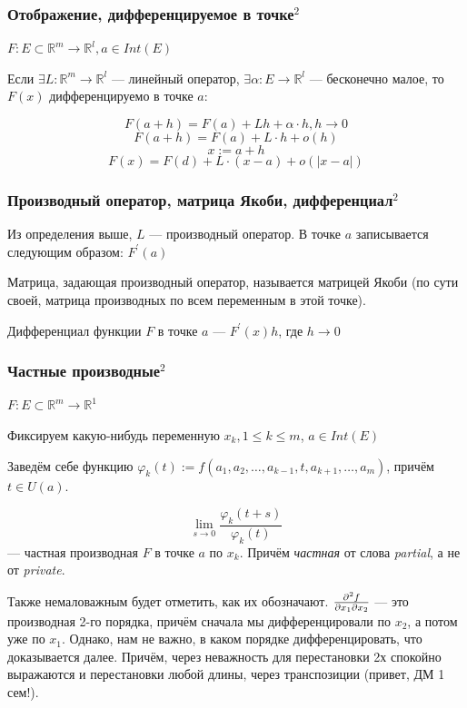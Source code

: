 \documentclass{article}
\begin{document}
\subsubsection{Отображение, дифференцируемое в точке\texorpdfstring{$^2$}{}}

$F : E \subset \mathbb{R}^m \rightarrow \mathbb{R}^l, a \in Int(E)$

Если $\exists L : \mathbb{R}^m \rightarrow \mathbb{R}^l$ --- линейный оператор, $\exists \alpha : E \rightarrow \mathbb{R}^l$ --- бесконечно малое, то $F(x)$ дифференцируемо в точке $a$:

$$
F(a+h)=F(a)+Lh+\alpha \cdot h, h \rightarrow 0
$$
$$
F(a+h)=F(a)+L \cdot h+o(h)
$$
$$
x:=a+h
$$
$$
F(x)=F(d)+L \cdot(x-a)+o(|x-a|)
$$

\subsubsection{Производный оператор, матрица Якоби, дифференциал\texorpdfstring{$^2$}{}}

Из определения выше, $L$ --- производный оператор.
В точке $a$ записывается следующим образом: $F^\prime(a)$


Матрица, задающая производный оператор, называется матрицей Якоби (по сути своей, матрица производных по всем переменным в этой точке).

Дифференциал функции $F$ в точке $a$ --- $F^\prime(x)h$, где $h \rightarrow 0$

\subsubsection{Частные производные\texorpdfstring{$^2$}{}}

$F : E \subset \mathbb{R}^m \rightarrow \mathbb{R}^1 $

Фиксируем какую-нибудь переменную $x_k, 1 \le k \le m$, $a \in Int(E)$

Заведём себе функцию $\varphi_k(t) := f(a_1, a_2, \ldots, a_{k - 1}, t, a_{k + 1}, \ldots, a_m)$, причём $t \in U(a)$.

\[\lim_{s \rightarrow 0} \frac{\varphi_k(t + s)}{\varphi_k(t)}\] --- частная производная $F$ в точке
$a$ по $x_k$. Причём \textit{частная} от слова \textit{partial}, а не от \textit{private}.

Также немаловажным будет отметить, как их обозначают. $\pdv{f}{x_1}{x_2}$ --- это производная 2-го порядка, причём сначала мы дифференцировали по $x_2$, а потом уже по $x_1$. Однако, нам не важно, в каком порядке дифференцировать, что доказывается далее. Причём, через неважность для перестановки 2х спокойно выражаются и перестановки любой длины, через транспозиции (привет, ДМ 1 сем!).
\end{document}
